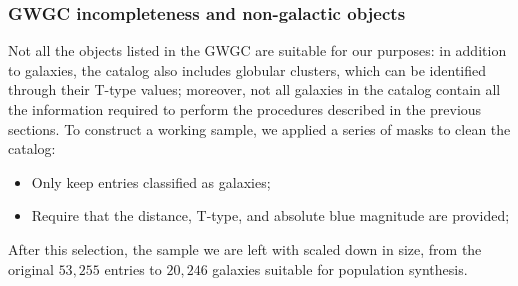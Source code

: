 \subsubsection{GWGC incompleteness and non-galactic objects}
Not all the objects listed in the GWGC are suitable for our purposes:
in addition to galaxies, the catalog also includes globular clusters, which can be identified through their T-type values; 
moreover, not all galaxies in the catalog contain all the information required to perform the procedures described in the previous sections.
To construct a working sample, we applied a series of masks to clean the catalog:
\begin{itemize}
    \item Only keep entries classified as galaxies; 
    \item Require that the distance, T-type, and absolute blue magnitude are provided; 
\end{itemize}
After this selection, the sample we are left with scaled down in size, from the original $53,255$ entries to $20,246$ galaxies suitable for population synthesis.

